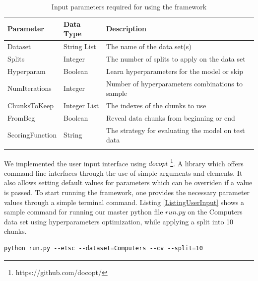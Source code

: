 \begin{table}[hbt!]
  \setlength\extrarowheight{2pt} %
  \begin{tabularx}{\textwidth}{|X|X|X|}
  \hline
  \textbf{Parameter} & \textbf{Data Type} & \textbf{Description} \\ \hline
    Dataset         & String List        & The name of the data set(s)                        \\ \hline
    Splits          & Integer            & The number of splits to apply on the data set      \\ \hline
    Hyperparam      & Boolean            & Learn hyperparameters for the model or skip        \\ \hline
    NumIterations   & Integer            & Number of hyperparameters combinations to sample   \\ \hline
    ChunksToKeep    & Integer List       & The indexes of the chunks to use                   \\ \hline
    FromBeg         & Boolean            & Reveal data chunks from beginning or end           \\ \hline
    ScoringFunction & String             & The strategy for evaluating the model on test data \\ \hline \\
  \end{tabularx}
  \caption{Input parameters required for using the framework}
  \label{TableUserInput}
\end{table}

We implemented the user input interface using $docopt$ \footnote{https://github.com/docopt/}. A library which offers command-line interfaces through
the use of simple arguments and elements. It also allows setting default values for parameters which can be overriden if a value is passed.
To start running the framework, one provides the necessary parameter values through a simple terminal command.
Listing \ref{ListingUserInput} shows a sample command for running our master python file $run.py$ on the Computers data set using hyperparameters optimization,
while applying a split into 10 chunks.

\lstset{basicstyle=\ttfamily\small}
\begin{lstlisting}[language=Comsol,caption={Sample command for providing user input to the framework},captionpos=b,label={ListingUserInput}]
  python run.py --etsc --dataset=Computers --cv --split=10
\end{lstlisting}

